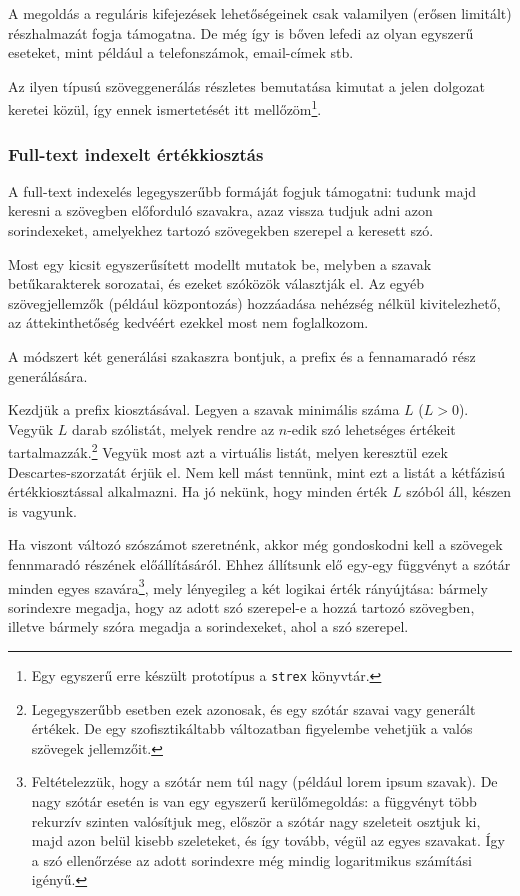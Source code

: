 \documentclass[
    parspace,
    noindent,
    nohyp,
]{elteiktdk}[2023/04/10]
\begin{document}
A megoldás a reguláris kifejezések lehetőségeinek csak valamilyen (erősen limitált) részhalmazát fogja támogatna.
De még így is bőven lefedi az olyan egyszerű eseteket, mint például a telefonszámok, email-címek stb.

Az ilyen típusú szöveggenerálás részletes bemutatása kimutat a jelen dolgozat keretei közül,
így ennek ismertetését itt mellőzöm\footnote{
  Egy egyszerű erre készült prototípus a \texttt{strex} könyvtár.
}.

\subsubsection{Full-text indexelt értékkiosztás}

A full-text indexelés legegyszerűbb formáját fogjuk támogatni:
tudunk majd keresni a szövegben előforduló szavakra,
azaz vissza tudjuk adni azon sorindexeket,
amelyekhez tartozó szövegekben szerepel a keresett szó.

Most egy kicsit egyszerűsített modellt mutatok be,
melyben a szavak betűkarakterek sorozatai,
és ezeket szóközök választják el.
Az egyéb szövegjellemzők (például központozás) hozzáadása nehézség nélkül kivitelezhető,
az áttekinthetőség kedvéért ezekkel most nem foglalkozom.

A módszert két generálási szakaszra bontjuk, a prefix és a fennamaradó rész generálására.

Kezdjük a prefix kiosztásával.
Legyen a szavak minimális száma $L$ ($L > 0$).
Vegyük $L$ darab szólistát, melyek rendre az $n$-edik szó lehetséges értékeit tartalmazzák.\footnote{
  Legegyszerűbb esetben ezek azonosak, és egy szótár szavai vagy generált értékek.
  De egy szofisztikáltabb változatban figyelembe vehetjük a valós szövegek jellemzőit.
}
Vegyük most azt a virtuális listát, melyen keresztül ezek Descartes-szorzatát érjük el.
Nem kell mást tennünk, mint ezt a listát a kétfázisú értékkiosztással alkalmazni.
Ha jó nekünk, hogy minden érték $L$ szóból áll, készen is vagyunk.

Ha viszont változó szószámot szeretnénk,
akkor még gondoskodni kell a szövegek fennmaradó részének előállításáról.
Ehhez állítsunk elő egy-egy függvényt a szótár minden egyes szavára\footnote{
  Feltételezzük, hogy a szótár nem túl nagy (például lorem ipsum szavak).
  De nagy szótár esetén is van egy egyszerű kerülőmegoldás:
  a függvényt több rekurzív szinten valósítjuk meg,
  először a szótár nagy szeleteit osztjuk ki,
  majd azon belül kisebb szeleteket, és így tovább, végül az egyes szavakat.
  Így a szó ellenőrzése az adott sorindexre még mindig logaritmikus számítási igényű.
}, mely lényegileg a két logikai érték rányújtása:
bármely sorindexre megadja, hogy az adott szó szerepel-e a hozzá tartozó szövegben,
illetve bármely szóra megadja a sorindexeket, ahol a szó szerepel.
\end{document}
